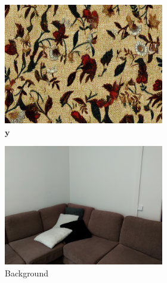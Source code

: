 \begin{figure}[]
    \begin{subfigure}{\textwidth}
        \centering
        \begin{subfigure}{0.24\textwidth}
            \centering
            \includegraphics[width=\textwidth]{images/04-experiment02/sofa/flowers2/target.jpg}
            \caption*{\(\bm{y}\)}
        \end{subfigure}
        \hfill
        \begin{subfigure}{0.24\textwidth}
            \centering
            \includegraphics[width=\textwidth]{images/04-experiment02/sofa/bg.jpg}
            \caption*{Background}
        \end{subfigure}
        \hfill
        \begin{subfigure}{0.24\textwidth}

\end{subfigure}
\end{subfigure}
\end{figure}
